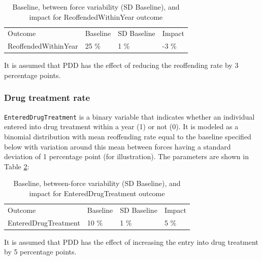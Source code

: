 \documentclass[
]{article}
\begin{document}
\begin{table}[H]

\caption{\label{tab:reoffending}Baseline, between force variability (SD Baseline), and impact for ReoffendedWithinYear outcome}
\centering
\begin{tabular}[t]{llll}
\toprule
\multicolumn{1}{l}{Outcome} & \multicolumn{1}{l}{Baseline} & \multicolumn{1}{l}{SD Baseline} & \multicolumn{1}{l}{Impact} \\
\cmidrule(l{3pt}r{3pt}){1-1} \cmidrule(l{3pt}r{3pt}){2-2} \cmidrule(l{3pt}r{3pt}){3-3} \cmidrule(l{3pt}r{3pt}){4-4}
ReoffendedWithinYear & 25 \% & 1 \% & -3 \%\\
\bottomrule
\end{tabular}
\end{table}

It is assumed that PDD has the effect of reducing the reoffending rate by 3 percentage points.

\hypertarget{drug-treatment-rate}{%
\subsubsection{Drug treatment rate}\label{drug-treatment-rate}}

\texttt{EnteredDrugTreatment} is a binary variable that indicates whether an individual entered into drug treatment within a year (1) or not (0). It is modeled as a binomial distribution with mean reoffending rate equal to the baseline specified below with variation around this mean between forces having a standard deviation of 1 percentage point (for illustration). The parameters are shown in Table \ref{tab:rehab}:

\begin{table}[H]

\caption{\label{tab:rehab}Baseline, between-force variability (SD Baseline), and impact for EnteredDrugTreatment outcome}
\centering
\begin{tabular}[t]{llll}
\toprule
\multicolumn{1}{l}{Outcome} & \multicolumn{1}{l}{Baseline} & \multicolumn{1}{l}{SD Baseline} & \multicolumn{1}{l}{Impact} \\
\cmidrule(l{3pt}r{3pt}){1-1} \cmidrule(l{3pt}r{3pt}){2-2} \cmidrule(l{3pt}r{3pt}){3-3} \cmidrule(l{3pt}r{3pt}){4-4}
EnteredDrugTreatment & 10 \% & 1 \% & 5 \%\\
\bottomrule
\end{tabular}
\end{table}

It is assumed that PDD has the effect of increasing the entry into drug treatment by 5 percentage points.
\end{document}

